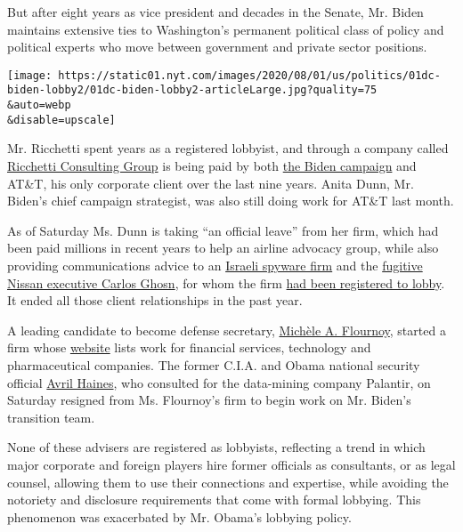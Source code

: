 But after eight years as vice president and decades in the Senate, Mr.
Biden maintains extensive ties to Washington's permanent political class
of policy and political experts who move between government and private
sector positions.

\texttt{[image: https://static01.nyt.com/images/2020/08/01/us/politics/01dc-biden-lobby2/01dc-biden-lobby2-articleLarge.jpg?quality=75\\\&auto=webp\\\&disable=upscale]}

Mr. Ricchetti spent years as a registered lobbyist, and through a
company called
\href{https://www.documentcloud.org/documents/7010940-Biden-s-Campaign-Chairman-Formed-a-Consulting.html}{Ricchetti
Consulting Group} is being paid by both
\href{https://docquery.fec.gov/cgi-bin/fecimg/?202007209260662530}{the
Biden campaign} and AT\&T, his only corporate client over the last nine
years. Anita Dunn, Mr. Biden's chief campaign strategist, was also still
doing work for AT\&T last month.

As of Saturday Ms. Dunn is taking ``an official leave'' from her firm,
which had been paid millions in recent years to help an airline advocacy
group, while also providing communications advice to an
\href{https://www.fastcompany.com/90326297/despite-ban-on-spyware-ads-google-allows-ad-blitz-by-hacking-firm-nso-group}{Israeli
spyware firm} and the
\href{https://www.nytimes.com/2018/12/30/business/carlos-ghosn-nissan.html}{fugitive
Nissan executive Carlos Ghosn}, for whom the firm
\href{https://soprweb.senate.gov/index.cfm?event=getFilingDetails\&filingID=55E9C7ED-A93B-4EAE-89BD-EEDE67B2C6DC\&filingTypeID=71}{had
been registered to lobby}. It ended all those client relationships in
the past year.

A leading candidate to become defense secretary,
\href{https://secure.joebiden.com/onlineactions/D4_IIHrm0UuSIFTqaXIRbg2?attr=100631128\&fbclid=IwAR28X8O4TQiVQ3h8k8NW6tTZP4JhoiaR0mVS8N0w3N0tzyKalfFUw4sraaQ}{Michèle
A. Flournoy}, started a firm whose
\href{http://westexec.com/\#about}{website} lists work for financial
services, technology and pharmaceutical companies. The former C.I.A. and
Obama national security official
\href{https://secure.joebiden.com/onlineactions/-SChB7ieakavs37tU3NAZA2?attr=100631128\&fbclid=IwAR2_qh2WkEzd-Oj-GXwD-kFly0zIfeQe1wgZdkBrOWexdi06sy11yqQiNqs}{Avril
Haines}, who consulted for the data-mining company Palantir, on Saturday
resigned from Ms. Flournoy's firm to begin work on Mr. Biden's
transition team.

None of these advisers are registered as lobbyists, reflecting a trend
in which major corporate and foreign players hire former officials as
consultants, or as legal counsel, allowing them to use their connections
and expertise, while avoiding the notoriety and disclosure requirements
that come with formal lobbying. This phenomenon was exacerbated by Mr.
Obama's lobbying policy.

